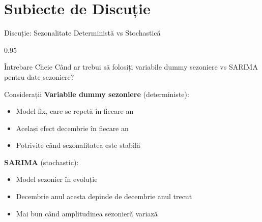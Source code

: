 \documentclass[9pt, aspectratio=169, t]{beamer}
\begin{document}
\section{Subiecte de Discuție}

\begin{frame}{Discuție: Sezonalitate Deterministă vs Stochastică}
    \begin{cminipage}{0.95\textwidth}
    \begin{block}{Întrebare Cheie}
        Când ar trebui să folosiți variabile dummy sezoniere vs SARIMA pentru date sezoniere?
    \end{block}

    \vspace{0.2cm}

    \begin{block}{Considerații}
        \textbf{Variabile dummy sezoniere} (deterministe):
        \begin{itemize}\setlength{\itemsep}{0pt}
            \item Model fix, care se repetă în fiecare an
            \item Același efect decembrie în fiecare an
            \item Potrivite când sezonalitatea este stabilă
        \end{itemize}

        \vspace{0.2cm}
        \textbf{SARIMA} (stochastic):
        \begin{itemize}\setlength{\itemsep}{0pt}
            \item Model sezonier în evoluție
            \item Decembrie anul acesta depinde de decembrie anul trecut
            \item Mai bun când amplitudinea sezonieră variază
        \end{itemize}
    \end{block}
    \end{cminipage}
\end{frame}
\end{document}
